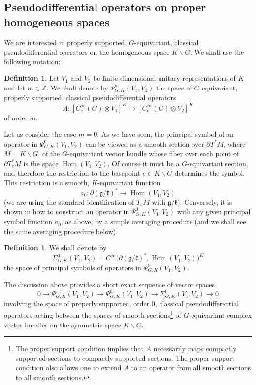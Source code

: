\documentclass[leqno,11pt]{amsart}
\numberwithin{equation}{subsection}
\theoremstyle{plain}
\theoremstyle{definition}
\newtheorem{definition}[equation]{Definition}
\theoremstyle{remark}
\newcommand{\Z}{\mathbb{Z}}
\DeclareMathOperator{\Hom}{Hom}
\begin{document}
\subsection{Pseudodifferential operators on proper homogeneous spaces}
\label{sec-psdos-on-proper-homogeneous-spaces}
We are interested in properly supported, $G$-equivariant, classical pseudodifferential operators on the homogeneous space $K\backslash G$. 
We shall use the following notation:

\begin{definition} Let $V_1$ and $V_2$ be finite-dimensional unitary representations of $K$ and let $m\in \Z$.
We shall denote by 
$\Psi^{m}_{G,K}(V_1,V_2)$
the space of $G$-equivariant, properly supported, classical pseudodifferential operators 
\[
A \colon [ C_c^\infty  (G)\otimes V_1]^K  \longrightarrow 
[ C_c^\infty  (G)\otimes V_2]^K 
\]
of order $m$.
\end{definition} 

Let us consider the case $m{=}0$. As we have seen,  the principal symbol of an operator in $\Psi^0_{G,K}(V_1,V_2)$ can be viewed as a smooth section over $\partial T^* M$, where $M=K \backslash G$, of the $G$-equivariant vector bundle whose fiber over each point of $\partial T^*_e M$ is the space $\Hom (V_1,V_2)$.  Of course it must be a $G$-equivariant section, and therefore the restriction to the basepoint $e\in K \backslash G$ determines the symbol.  This restriction is a smooth, $K$-equivariant function 
\[
a_0 \colon \partial (\mathfrak{g}/\mathfrak{k})^* \longrightarrow \Hom (V_1,V_2)
\]
(we are using the standard identification of $T_eM$ with $\mathfrak{g} / \mathfrak{k}$). 
Conversely, it is shown in  \cite{Stetkaer71} how to construct  an operator in $\Psi^0_{G,K}(V_1,V_2)$ with any given principal symbol function $a_0$, as above, by a simple averaging procedure (and we shall see the same averaging procedure below). 

\begin{definition}
We shall denote by  
\[
\Sigma^0_{G,K} (V_1,V_2)= C^\infty \bigl ( \partial (\mathfrak{g}/\mathfrak{k})^* , \Hom(V_1,V_2)\bigr )^K
\]
the space of principal symbols of operators in $\Psi^0_{G,K}(V_1,V_2)$.   
\end{definition} 

The discussion above provides a short exact sequence of vector spaces
\begin{equation}
\label{eq-pseudodifferential-extension-before-completion}
    0 \longrightarrow \Psi^{-1}_{G,K}(V_1,V_2) \longrightarrow \Psi^0_{G,K}(V_1,V_2) \longrightarrow \Sigma^0_{G,K} (V_1,V_2)  \longrightarrow 0
\end{equation} 
involving the space of properly supported, order $0$, classical  pseudodifferential operators acting between the spaces of smooth sections\footnote{The proper support condition implies that $A$ necessarily maps compactly supported sections to compactly supported sections. The proper support condition also allows one to extend  $A$ to an operator from all smooth sections to all smooth sections.} of $G$-equivariant complex vector bundles on the symmetric space $K \backslash G$. 
\end{document}
